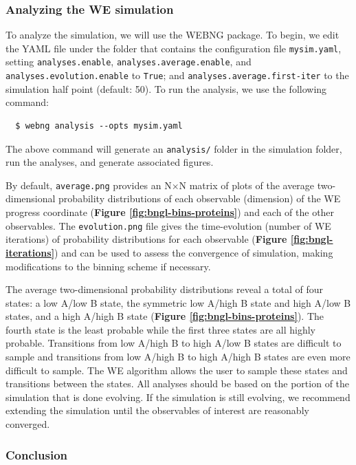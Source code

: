 \subsubsection{Analyzing the WE simulation}
To analyze the simulation, we will use the WEBNG package. 
To begin, we edit the YAML file under the folder that contains the configuration file \verb|mysim.yaml|, setting \verb|analyses.enable|, \verb|analyses.average.enable|, and \verb|analyses.evolution.enable| to \verb|True|; and \verb|analyses.average.first-iter| to the simulation half point (default: 50). 
To run the analysis, we use the following command: 

\begin{verbatim}
  $ webng analysis --opts mysim.yaml
\end{verbatim}

The above command will generate an \verb|analysis/| folder in the simulation folder, run the analyses, and generate associated figures. 

By default, \verb|average.png| provides an N$\times$N matrix of plots of the average two-dimensional probability distributions of each observable (dimension) of the WE progress coordinate  (\textbf{Figure \ref{fig:bngl-bins-proteins}}) and each of the other observables. 
The \verb|evolution.png| file gives the time-evolution (number of WE iterations) of probability distributions for each observable  (\textbf{Figure \ref{fig:bngl-iterations}}) and can be used to assess the convergence of simulation, making modifications to the binning scheme if necessary. 


The average two-dimensional probability distributions reveal a total of four states: a low A/low B state, the symmetric low A/high B state and high A/low B states, and a high A/high B state  (\textbf{Figure \ref{fig:bngl-bins-proteins}}). 
The fourth state is the least probable while the first three states are all highly probable. 
Transitions from low A/high B to high A/low B states are difficult to sample and transitions from low A/high B to high A/high B states are even more difficult to sample. 
The WE algorithm allows the user to sample these states and transitions between the states. 
All analyses should be based on the portion of the simulation that is done evolving. 
If the simulation is still evolving, we recommend extending the simulation until the observables of interest are reasonably converged. 

\subsubsection{Conclusion}

